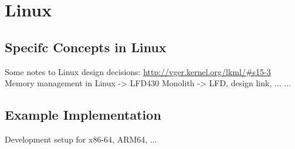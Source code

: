 \section{Linux} \label{sec:cs-linux}

\subsection{Specifc Concepts in Linux} \label{subsec:concepts-linux}
    Some notes to Linux design decisions: \url{http://vger.kernel.org/lkml/#s15-3}
    Memory management in Linux -> LFD430
    Monolith -> LFD, design link, ...
    ...

\subsection{Example Implementation} %
    Development setup for x86-64, ARM64, ...

